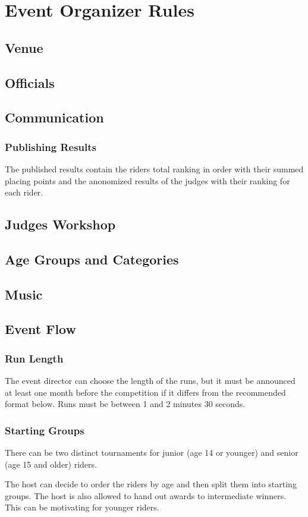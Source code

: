 \chapter{Event Organizer Rules}

\section{Venue}
\section{Officials}
\section{Communication}

\subsection{Publishing Results}
The published results contain the riders total ranking in order with their summed placing points and the anonomized results of the judges with their ranking for each rider.

\section{Judges Workshop}
\section{Age Groups and Categories}
\section{Music}
\section{Event Flow}


\subsection{Run Length}

The event director can choose the length of the runs, but it must be announced at least one month before the competition if it differs from the recommended format below.
Runs must be between 1 and 2 minutes 30 seconds.

\subsection{Starting Groups}
There can be two distinct tournaments for junior (age 14 or younger) and senior (age 15 and older) riders.

The host can decide to order the riders by age and then split them into starting groups.
The host is also allowed to hand out awards to intermediate winners.
This can be motivating for younger riders.
